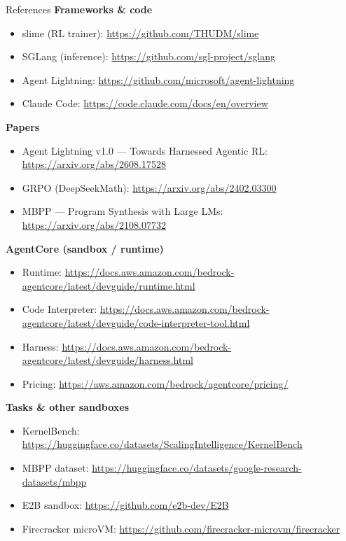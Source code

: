 \documentclass[aspectratio=169]{beamer}
\begin{document}
\begin{frame}[allowframebreaks]{References}
  \scriptsize
  \textbf{Frameworks \& code}
  \begin{itemize}\setlength\itemsep{0.1em}
    \item slime (RL trainer): \url{https://github.com/THUDM/slime}
    \item SGLang (inference): \url{https://github.com/sgl-project/sglang}
    \item Agent Lightning: \url{https://github.com/microsoft/agent-lightning}
    \item Claude Code: \url{https://code.claude.com/docs/en/overview}
  \end{itemize}
  \textbf{Papers}
  \begin{itemize}\setlength\itemsep{0.1em}
    \item Agent Lightning v1.0 --- Towards Harnessed Agentic RL: \url{https://arxiv.org/abs/2608.17528}
    \item GRPO (DeepSeekMath): \url{https://arxiv.org/abs/2402.03300}
    \item MBPP --- Program Synthesis with Large LMs: \url{https://arxiv.org/abs/2108.07732}
  \end{itemize}
  \textbf{AgentCore (sandbox / runtime)}
  \begin{itemize}\setlength\itemsep{0.1em}
    \item Runtime: \url{https://docs.aws.amazon.com/bedrock-agentcore/latest/devguide/runtime.html}
    \item Code Interpreter: \url{https://docs.aws.amazon.com/bedrock-agentcore/latest/devguide/code-interpreter-tool.html}
    \item Harness: \url{https://docs.aws.amazon.com/bedrock-agentcore/latest/devguide/harness.html}
    \item Pricing: \url{https://aws.amazon.com/bedrock/agentcore/pricing/}
  \end{itemize}
  \textbf{Tasks \& other sandboxes}
  \begin{itemize}\setlength\itemsep{0.1em}
    \item KernelBench: \url{https://huggingface.co/datasets/ScalingIntelligence/KernelBench}
    \item MBPP dataset: \url{https://huggingface.co/datasets/google-research-datasets/mbpp}
    \item E2B sandbox: \url{https://github.com/e2b-dev/E2B}
    \item Firecracker microVM: \url{https://github.com/firecracker-microvm/firecracker}

\end{itemize}
\end{frame}
\end{document}
